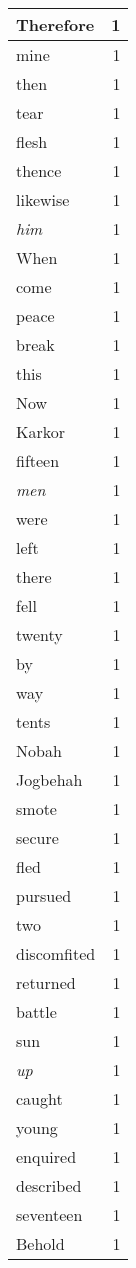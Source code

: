\begin{center}
\begin{longtable}{l|r}
Therefore & 1\\ \hline 
mine & 1\\ \hline 
then & 1\\ \hline 
tear & 1\\ \hline 
flesh & 1\\ \hline 
thence & 1\\ \hline 
likewise & 1\\ \hline 
\emph{him} & 1\\ \hline 
When & 1\\ \hline 
come & 1\\ \hline 
peace & 1\\ \hline 
break & 1\\ \hline 
this & 1\\ \hline 
Now & 1\\ \hline 
Karkor & 1\\ \hline 
fifteen & 1\\ \hline 
\emph{men} & 1\\ \hline 
were & 1\\ \hline 
left & 1\\ \hline 
there & 1\\ \hline 
fell & 1\\ \hline 
twenty & 1\\ \hline 
by & 1\\ \hline 
way & 1\\ \hline 
tents & 1\\ \hline 
Nobah & 1\\ \hline 
Jogbehah & 1\\ \hline 
smote & 1\\ \hline 
secure & 1\\ \hline 
fled & 1\\ \hline 
pursued & 1\\ \hline 
two & 1\\ \hline 
discomfited & 1\\ \hline 
returned & 1\\ \hline 
battle & 1\\ \hline 
sun & 1\\ \hline 
\emph{up} & 1\\ \hline 
caught & 1\\ \hline 
young & 1\\ \hline 
enquired & 1\\ \hline 
described & 1\\ \hline 
seventeen & 1\\ \hline 
Behold & 1\\ \hline 

\end{longtable}
\end{center}
